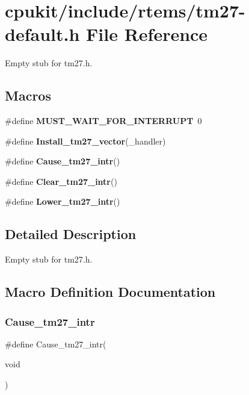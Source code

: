 \hypertarget{tm27-default_8h}{}\section{cpukit/include/rtems/tm27-\/default.h File Reference}
\label{tm27-default_8h}


Empty stub for tm27.\+h.  


\subsection*{Macros}
\begin{DoxyCompactItemize}
\item 
\mbox{\label{tm27-default_8h_a00a44436eb28b5b03d1cba2dcdf7382f}} 
\#define {\bfseries M\+U\+S\+T\+\_\+\+W\+A\+I\+T\+\_\+\+F\+O\+R\+\_\+\+I\+N\+T\+E\+R\+R\+U\+PT}~0
\item 
\#define {\bfseries Install\+\_\+tm27\+\_\+vector}(\+\_\+handler)
\item 
\#define {\bfseries Cause\+\_\+tm27\+\_\+intr}()
\item 
\#define {\bfseries Clear\+\_\+tm27\+\_\+intr}()
\item 
\#define {\bfseries Lower\+\_\+tm27\+\_\+intr}()
\end{DoxyCompactItemize}


\subsection{Detailed Description}
Empty stub for tm27.\+h. 



\subsection{Macro Definition Documentation}
\mbox{\label{tm27-default_8h_a31c3068f1561630ef247cc984a25990b}} 
\subsubsection{\texorpdfstring{Cause\_tm27\_intr}{Cause\_tm27\_intr}}
{\footnotesize\ttfamily \#define Cause\+\_\+tm27\+\_\+intr(\begin{DoxyParamCaption}\item[{}]{void }\end{DoxyParamCaption})}

